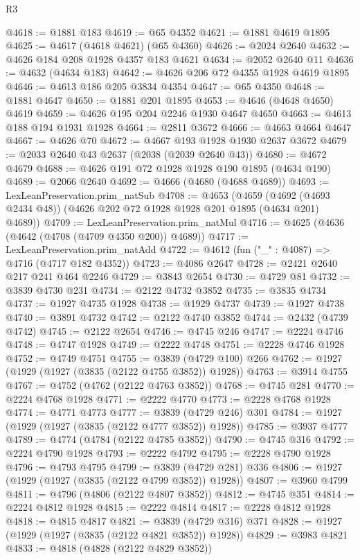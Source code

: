 \begin{lexlean}{R3}
\begin{coremodule}
@4618 := @1881 @183
@4619 := @65 @4352
@4621 := @1881 @4619 @1895
@4625 := @4617 (@4618 @4621) (@65 @4360)
@4626 := @2024 @2640
@4632 := @4626 @184 @208 @1928 @4357 @183 @4621
@4634 := @2052 @2640 @11
@4636 := @4632 (@4634 @183)
@4642 := @4626 @206 @72 @4355 @1928 @4619 @1895
@4646 := @4613 @186 @205 @3834 @4354
@4647 := @65 @4350
@4648 := @1881 @4647
@4650 := @1881 @201 @1895
@4653 := @4646 (@4648 @4650) @4619
@4659 := @4626 @195 @204 @2246 @1930 @4647 @4650
@4663 := @4613 @188 @194 @1931 @1928
@4664 := @2811 @3672
@4666 := @4663 @4664 @4647
@4667 := @4626 @70
@4672 := @4667 @193 @1928 @1930 @2637 @3672
@4679 := @2033 @2640 @43 @2637 (@2038 (@2039 @2640 @43))
@4680 := @4672 @4679
@4688 := @4626 @191 @72 @1928 @1928 @190 @1895 (@4634 @190)
@4689 := @2066 @2640
@4692 := @4666 (@4680 (@4688 @4689))
@4693 := LexLeanPreservation.prim_natSub
@4708 := @4653
    (@4659 (@4692 (@4693 @2434 @48)) (@4626 @202 @72 @1928 @1928 @201 @1895 (@4634 @201) @4689))
@4709 := LexLeanPreservation.prim_natMul
@4716 := @4625 (@4636 (@4642 (@4708 (@4709 @4350 @200)) @4689))
@4717 := LexLeanPreservation.prim_natAdd
@4722 := @4612 (fun ("_" : @4087) => @4716 (@4717 @182 @4352))
@4723 := @4086 @2647
@4728 := @2421 @2640 @217 @241 @464 @2246
@4729 := @3843 @2654
@4730 := @4729 @81
@4732 := @3839 @4730 @231
@4734 := @2122 @4732 @3852
@4735 := @3835 @4734
@4737 := @1927 @4735 @1928
@4738 := @1929 @4737
@4739 := @1927 @4738
@4740 := @3891 @4732
@4742 := @2122 @4740 @3852
@4744 := @2432 (@4739 @4742)
@4745 := @2122 @2654
@4746 := @4745 @246
@4747 := @2224 @4746
@4748 := @4747 @1928
@4749 := @2222 @4748
@4751 := @2228 @4746 @1928
@4752 := @4749 @4751
@4755 := @3839 (@4729 @100) @266
@4762 := @1927 (@1929 (@1927 (@3835 (@2122 @4755 @3852)) @1928))
@4763 := @3914 @4755
@4767 := @4752 (@4762 (@2122 @4763 @3852))
@4768 := @4745 @281
@4770 := @2224 @4768 @1928
@4771 := @2222 @4770
@4773 := @2228 @4768 @1928
@4774 := @4771 @4773
@4777 := @3839 (@4729 @246) @301
@4784 := @1927 (@1929 (@1927 (@3835 (@2122 @4777 @3852)) @1928))
@4785 := @3937 @4777
@4789 := @4774 (@4784 (@2122 @4785 @3852))
@4790 := @4745 @316
@4792 := @2224 @4790 @1928
@4793 := @2222 @4792
@4795 := @2228 @4790 @1928
@4796 := @4793 @4795
@4799 := @3839 (@4729 @281) @336
@4806 := @1927 (@1929 (@1927 (@3835 (@2122 @4799 @3852)) @1928))
@4807 := @3960 @4799
@4811 := @4796 (@4806 (@2122 @4807 @3852))
@4812 := @4745 @351
@4814 := @2224 @4812 @1928
@4815 := @2222 @4814
@4817 := @2228 @4812 @1928
@4818 := @4815 @4817
@4821 := @3839 (@4729 @316) @371
@4828 := @1927 (@1929 (@1927 (@3835 (@2122 @4821 @3852)) @1928))
@4829 := @3983 @4821
@4833 := @4818 (@4828 (@2122 @4829 @3852))

\end{coremodule}
\end{lexlean}
